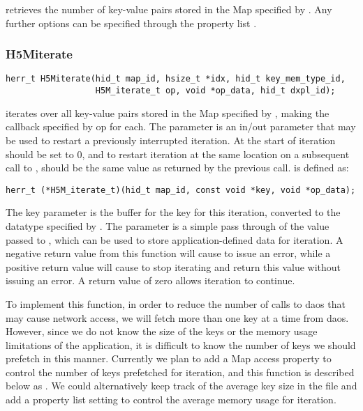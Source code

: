 \documentclass[../design_doc.tex]{subfiles}
\begin{document}
 retrieves the number of key-value pairs stored in the Map specified by . Any further options can be specified through the property list .

\subsubsection{H5Miterate}

\begin{verbatim}
herr_t H5Miterate(hid_t map_id, hsize_t *idx, hid_t key_mem_type_id,
                  H5M_iterate_t op, void *op_data, hid_t dxpl_id);
\end{verbatim}

 iterates over all key-value pairs stored in the Map specified by , making the callback specified by op for each. The  parameter is an in/out parameter that may be used to restart a previously interrupted iteration. At the start of iteration  should be set to 0, and to restart iteration at the same location on a subsequent call to ,  should be the same value as returned by the previous call.
 is defined as:
\begin{verbatim}
herr_t (*H5M_iterate_t)(hid_t map_id, const void *key, void *op_data);
\end{verbatim}

The key parameter is the buffer for the key for this iteration, converted to the datatype specified by . The  parameter is a simple pass through of the value passed to , which can be used to store application-defined data for iteration. A negative return value from this function will cause  to issue an error, while a positive return value will cause  to stop iterating and return this value without issuing an error. A return value of zero allows iteration to continue.

To implement this function, in order to reduce the number of calls to \acrshort{daos} that may cause network access, we will fetch more than one key at a time from \acrshort{daos}. However, since we do not know the size of the keys or the memory usage limitations of the application, it is difficult to know the number of keys we should prefetch in this manner. Currently we plan to add a Map access property to control the number of keys prefetched for iteration, and this function is described below as . We could alternatively keep track of the average key size in the file and add a property list setting to control the average memory usage for iteration.
\end{document}
